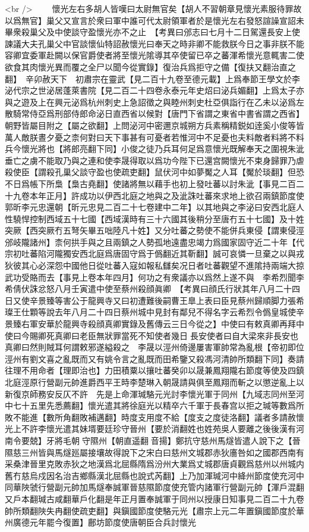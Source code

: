 <br />
　　懷光左右多胡人皆嘆曰太尉無官矣【胡人不習朝章見懷光素服待罪故以爲無官】巢父又宣言於衆曰軍中誰可代太尉領軍者於是懷光左右發怒諠譟宣詔未畢衆殺巢父及中使談守盈懷光亦不之止　【考異曰邠志曰七月十二日駕還長安上使諫議大夫孔巢父中官談懷仙特詔赦懷光曰奉天之時非卿不能救朕今日之事非朕不能容卿宜委軍赴闕以保官爵使者將至懷光隂導其卒使留已卒之蕃渾希懷光意輒害二使欲食其肉懷光異而覆之全尸以聞今從實錄】復治兵爲拒守之備【復扶又翻治直之翻】　辛卯赦天下　初肅宗在靈武【見二百十九卷至德元載】上爲奉節王學文於李泌代宗之世泌居蓬萊書院【見二百二十四卷永泰元年史炤曰泌兵媚翻】上爲太子亦與之遊及上在興元泌爲杭州刺史上急詔徵之與睦州刺史杜亞俱詣行在乙未以泌爲左散騎常侍亞爲刑部侍郎命泌日直西省以候對【唐門下省謂之東省中書省謂之西省】朝野皆屬目附之【屬之欲翻】上問泌河中密邇京城朔方兵素稱精鋭如逹奚小俊等皆萬人敵朕晝夕憂之柰何對曰天下事甚有可憂者若惟河中不足憂也夫料敵者料將不料兵今懷光將也【將郎亮翻下同】小俊之徒乃兵耳何足爲意懷光既解奉天之圍視朱泚垂亡之虜不能取乃與之連和使李晟得取以爲功今陛下已還宫闕懷光不束身歸罪乃虐殺使臣【謂殺孔巢父談守盈也使疏吏翻】鼠伏河中如夢魘之人耳【魘於琰翻】但恐不日爲帳下所梟【梟古堯翻】使諸將無以藉手也初上發吐蕃以討朱泚【事見二百二十九卷本年正月】許成功以伊西北庭之地與之及泚誅吐蕃來求地上欲召兩鎮節度使郭昕李元忠還朝【昕元忠見二百二十七卷建中二年】以其地與之李泌曰安西北庭人性驍悍控制西域五十七國【西域漢時有三十六國其後稍分至唐冇五十七國】及十姓突厥【西突厥冇五弩矢畢五咄陸凡十姓】又分吐蕃之勢使不能併兵東侵【謂東侵涇邠岐隴諸州】柰何拱手與之且兩鎮之人勢孤地遠盡忠竭力爲國家固守近二十年【代宗初吐蕃陷河隴獨安西北庭爲唐固守爲于僞翻近其靳翻】誠可哀憐一旦棄之以與戎狄彼其心必深怨中國他日從吐蕃入寇如報私讎矣况日者吐蕃觀望不進隂持兩端大掠武功受賂而去【事見上卷本年四月】何功之有衆議亦以爲然上遂不與　李希烈聞李希倩伏誅忿怒八月壬寅遣中使至蔡州殺顔眞卿　【考異曰顔氏行狀其年八月二十四日又使辛景臻等害公于龍興寺又曰初遭難後嗣曹王臯上表曰臣見蔡州歸順脚力張希璨王仕顆等說去年八月二十四日蔡州城中見封有鄰兒不得名字云希烈令僞皇城使辛景臻右軍安華於龍興寺殺顔真卿實錄及舊傳云三日今從之】中使曰有敕真卿再拜中使曰今賜卿死真卿曰老臣無狀罪當死不知使者幾日長安使者曰自大梁來非長安也真卿曰然則賊耳何謂敕邪遂縊殺之　李晟以涇州倚邊屢害軍帥常為亂根【帝初即位涇州有劉文喜之亂既而又有姚令言之亂既而田希鑒又殺馮河清帥所類翻下同】奏請往理不用命者【理即治也】力田積粟以攘吐蕃癸卯以晟兼鳳翔隴右節度等使及四鎮北庭涇原行營副元帥進爵西平王時李楚琳入朝晟請與俱至鳳翔而斬之以懲逆亂上以新復京師務安反仄不許　先是上命渾瑊駱元光討李懷光軍于同州【九域志同州至河中七十五里先悉薦翻】懷光遣其將徐庭光以精卒六千軍于長春宫以拒之瑊等數爲所敗不能進【數所角翻敗補邁翻】時度支用度不給【度支之度徒洛翻】議者多請赦懷光上不許李懷光遣其妹壻要廷珍守晉州【要於消翻姓也姓苑吳人要離之後後漢有河南令要兢】牙將毛朝守隰州【朝直遥翻音揚】鄭抗守慈州馬燧皆遣人說下之【晉隰慈三州皆與馬燧廵屬接壤故得說下之宋白曰慈州文城郡赤狄廧咎如之國郡西南有采桑津晉里克敗赤狄之地漢爲北屈縣隋爲汾州大業爲丈城郡唐貞觀爲慈州以州城内舊冇慈烏戍因名治吉鄉縣漢北屈縣也說式芮翻】上乃加渾瑊河中絳州節度使充河中同華陜虢行營副元帥加馬燧奉誠軍晉慈隰節度使充管内諸軍行營副元帥【渾戶混翻又戶本翻瑊古咸翻華戶化翻是年正月置奉誠軍于同州以授康日知事見二百二十九卷帥所類翻陜失冉翻使疏吏翻】與鎭國節度使駱元光【肅宗上元二年置鎭國節度於華州廣德元年罷今復置】鄜坊節度使唐朝臣合兵討懷光
